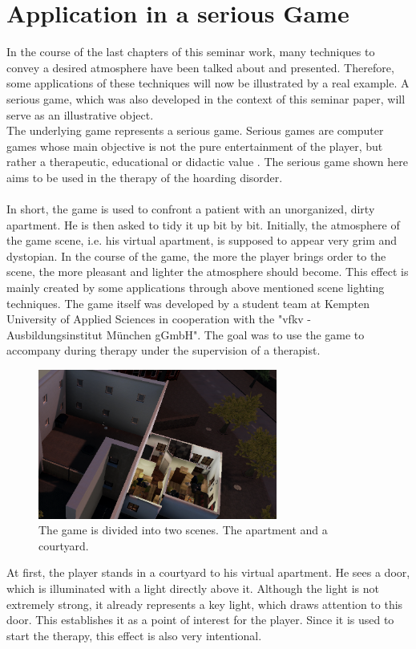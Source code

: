 \chapter{Application in a serious Game}
In the course of the last chapters of this seminar work, many techniques to convey a desired atmosphere have been talked about and presented. Therefore, some applications of these techniques will now be illustrated by a real example. A serious game, which was also developed in the context of this seminar paper, will serve as an illustrative object. \\

The underlying game represents a serious game. Serious games are computer games whose main objective is not the pure entertainment of the player, but rather a therapeutic, educational or didactic value \cite{serious}. The serious game shown here aims to be used in the therapy of the hoarding disorder. \\\\
In short, the game is used to confront a patient with an unorganized, dirty apartment. He is then asked to tidy it up bit by bit. Initially, the atmosphere of the game scene, i.e. his virtual apartment, is supposed to appear very grim and dystopian. In the course of the game, the more the player brings order to the scene, the more pleasant and lighter the atmosphere should become. This effect is mainly created by some applications through above mentioned scene lighting techniques. The game itself was developed by a student team at Kempten University of Applied Sciences in cooperation with the "vfkv - Ausbildungsinstitut München gGmbH". The goal was to use the game to accompany during therapy under the supervision of a therapist.
\begin{figure}[H]
	\centering
		\includegraphics[width=0.7\textwidth]{Bilder/Erfassen.PNG}
	\caption{The game is divided into two scenes. The apartment and a courtyard. }
	\label{fig:szenes}
\end{figure}
\newpage
At first, the player stands in a courtyard to his virtual apartment. He sees a door, which is illuminated with a light directly above it. Although the light is not extremely strong, it already represents a key light, which draws attention to this door. This establishes it as a point of interest for the player. Since it is used to start the therapy, this effect is also very intentional. \\

